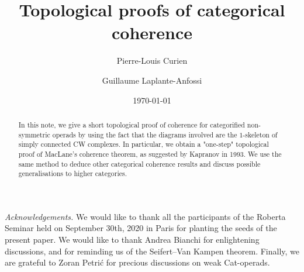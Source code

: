 \documentclass[10pt]{amsart}
\title{Topological proofs of categorical coherence}
\author{Pierre-Louis Curien}
\author{Guillaume Laplante-Anfossi}
\date{\today}
\begin{document}
\begin{abstract}
In this note, we give a short topological proof of coherence for categorified non-symmetric operads by using the fact that the diagrams involved are the $1$-skeleton of simply connected CW complexes. 
In particular, we obtain a "one-step" topological proof of MacLane's coherence theorem, as suggested by Kapranov in 1993. 
We use the same method to deduce other categorical coherence results and discuss possible generalisations to higher categories. 
\end{abstract}

\maketitle

\setcounter{tocdepth}{1}




%
%
%
%
\bigskip

\emph{Acknowledgements.}   
We would like to thank all the participants of the Roberta Seminar held on September 30th, 2020 in Paris for planting the seeds of the present paper.  
We would like to thank Andrea Bianchi for enlightening discussions, and for reminding us of the Seifert--Van Kampen theorem. 
Finally, we are grateful to Zoran Petri{\'c} for precious discussions on weak Cat-operads.




\end{document}
